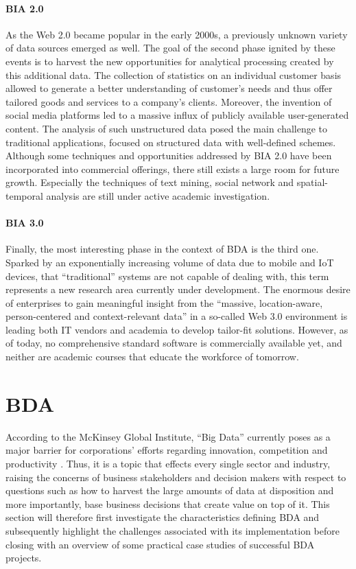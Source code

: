 \paragraph{\ac{BIA} 2.0} As the Web 2.0 became popular in the early 2000s, a previously unknown variety of data sources emerged as well. The goal of the second phase ignited by these events is to harvest the new opportunities for analytical processing created by this additional data. The collection of statistics on an individual customer basis allowed to generate a better understanding of customer's needs and thus offer tailored goods and services to a company's clients.
Moreover, the invention of social media platforms led to a massive influx of publicly available user-generated content. The analysis of such unstructured data posed the main challenge to traditional applications, focused on structured data with well-defined schemes. Although some techniques and opportunities addressed by \ac{BIA} 2.0 have been incorporated into commercial offerings, there still exists a large room for future growth. Especially the techniques of text mining, social network and spatial-temporal analysis are still under active academic investigation.

\paragraph{\ac{BIA} 3.0} Finally, the most interesting phase in the context of \ac{BDA} is the third one. Sparked by an exponentially increasing volume of data due to mobile and \ac{IoT} devices, that \enquote{traditional} systems are not capable of dealing with, this term represents a new research area currently under development. The enormous desire of enterprises to gain meaningful insight from the \enquote{massive, location-aware, person-centered and context-relevant data}\autocite[][p.~1168]{chen2012business} in a so-called Web 3.0 environment is leading both IT vendors and academia to develop tailor-fit solutions. However, as of today,  no comprehensive standard software is commercially available yet, and neither are academic courses that educate the workforce of tomorrow.

\section{\acl{BDA}}
\label{sota-bda}

According to the McKinsey Global Institute, \enquote{Big Data} currently poses as a major barrier for corporations' efforts regarding innovation, competition and productivity \autocite[p.~1 \psqq]{mckinseybd}. Thus, it is a topic that effects every single sector and industry, raising the concerns of business stakeholders and decision makers with respect to questions such as how to harvest the large amounts of data at disposition and more importantly, base business decisions that create value on top of it. This section will therefore first investigate the characteristics defining \ac{BDA} and subsequently highlight the challenges associated with its implementation before closing with an overview of some practical case studies of successful \ac{BDA} projects. 

